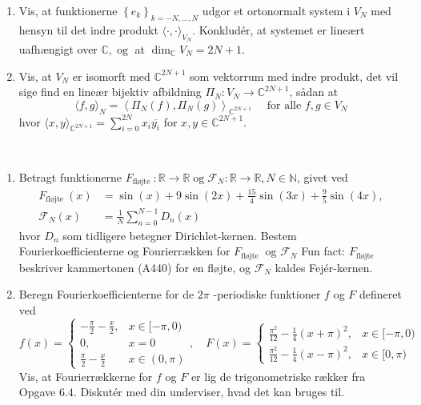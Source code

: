 \begin{itemize}
\begin{opg}[Vektorrumsstruktur]
\begin{enumerate}
\begin{enumerate}[label=\roman*)]
	\end{enumerate}
	\item Vis, at funktionerne $\left\{e_{k}\right\}_{k=-N, \ldots, N}$ udgor et ortonormalt system i $V_{N}$ med hensyn til det indre produkt $\langle\cdot, \cdot\rangle_{V_{N}} .$
	Konkludér, at systemet er lineært uafhængigt over $\mathbb{C}, \operatorname{og}$ at $\operatorname{dim}_{\mathbb{C}} V_{N}=2 N+1$.
	\item Vis, at $V_{N}$ er isomorft med $\mathbb{C}^{2 N+1}$ som vektorrum med indre produkt, det vil sige find en lineær bijektiv afbildning $\Pi_{N}: V_{N} \rightarrow \mathbb{C}^{2 N+1}$, sådan at
	$$
	\langle f, g\rangle_{N}=\left\langle\Pi_{N}(f), \Pi_{N}(g)\right\rangle_{\mathbb{C}^{2 N+1}} \quad \text { for alle } f, g \in V_{N}
	$$
	hvor $\langle x, y\rangle_{\mathbb{C}^{2 N+1}}=\sum_{i=0}^{2 N} x_{i} \overline{y_{i}}$ for $x, y \in \mathbb{C}^{2 N+1}$.
\end{enumerate}
\end{opg}

\begin{opg}[Fourierrækker II]\hfill \\
	\begin{enumerate}
		\item Betragt funktionerne $F_{\text {fløjte }}: \mathbb{R} \rightarrow \mathbb{R} \operatorname{og} \mathcal{F}_{N}: \mathbb{R} \rightarrow \mathbb{R}, N \in \mathbb{N}$, givet ved
		$$
		\begin{aligned}
		F_{\text {fløjte }}(x) &=\sin (x)+9 \sin (2 x)+\frac{15}{4} \sin (3 x)+\frac{9}{5} \sin (4 x), \\
		\mathcal{F}_{N}(x) &=\frac{1}{N} \sum_{n=0}^{N-1} D_{n}(x)
		\end{aligned}
		$$
		hvor $D_{n}$ som tidligere betegner Dirichlet-kernen. Bestem Fourierkoefficienterne og Fourierrækken for $F_{\text {fløjte }}$ og $ \mathcal{F}_{N}$
		Fun fact: $F_{\text {fløjte }}$ beskriver kammertonen (A440) for en fløjte, og $\mathcal{F}_{N}$ kaldes Fejér-kernen.
		
		\item Beregn Fourierkoefficienterne for de $2 \pi$ -periodiske funktioner $f$ og $F$ defineret ved
		$$
		f(x)=\begin{cases}
		-\frac{\pi}{2}-\frac{x}{2}, & x \in[-\pi, 0) \\
		0, & x=0 \\
		\frac{\pi}{2}-\frac{x}{2} & x \in(0, \pi)
		\end{cases}, \quad F(x)=\begin{cases}
		\frac{\pi^{2}}{12}-\frac{1}{4}(x+\pi)^{2}, & x \in[-\pi, 0) \\
		\frac{\pi^{2}}{12}-\frac{1}{4}(x-\pi)^{2}, & x \in[0, \pi)
		\end{cases}
		$$
		Vis, at Fourierrækkerne for $f$ og $F$ er lig de trigonometriske rækker fra Opgave $6.4$. Diskutér med din underviser, hvad det kan bruges til.
	\end{enumerate}
\end{opg}


\end{itemize}
